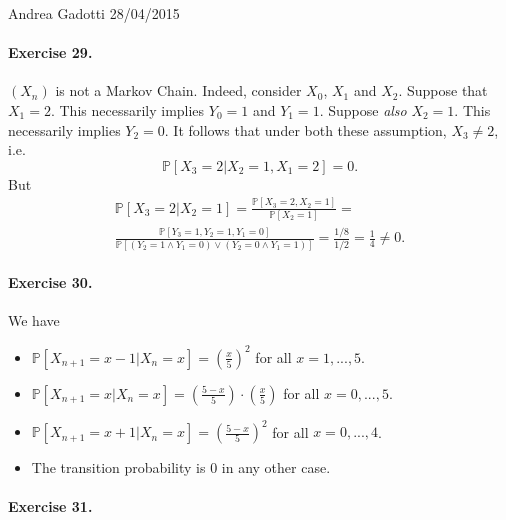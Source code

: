 \documentclass[12pt,a4paper]{report}
\theoremstyle{definition}
\theoremstyle{num.custom-title}
\renewcommand{\1}{\mathbbm{1}}
\renewcommand{\P}{\mathbb{P}}
\begin{document}
\noindent Andrea Gadotti \hfill 28/04/2015

\paragraph{Exercise 29.}

$(X_n)$ is not a Markov Chain. Indeed, consider $X_0$, $X_1$ and $X_2$. Suppose that $X_1=2$. This necessarily implies $Y_0=1$ and $Y_1=1$. Suppose \emph{also} $X_2=1$. This necessarily implies $Y_2=0$. It follows that under both these assumption, $X_3 \neq 2$, i.e.
\[
\P[X_3 = 2 | X_2=1, X_1=2] = 0.
\]
But
\begin{multline*}
\P[X_3 = 2 | X_2=1] = \frac{\P[X_3 = 2, X_2=1]}{\P[X_2=1]} = \\
\frac{\P[Y_3=1,Y_2=1,Y_1=0]}{\P[(Y_2=1 \wedge Y_1=0) \vee (Y_2=0 \wedge Y_1=1)]} = \frac{1/8}{1/2} = \frac{1}{4} \neq 0.
\end{multline*}


\paragraph{Exercise 30.}

We have 
\begin{itemize}
\item $\P[X_{n+1} = x-1 | X_n = x] = \left( \frac{x}{5} \right)^2$ for all $x=1,...,5$.
\item $\P[X_{n+1} = x | X_n = x] = \left( \frac{5-x}{5} \right) \cdot \left( \frac{x}{5} \right)$ for all $x=0,...,5$.
\item $\P[X_{n+1} = x+1 | X_n = x] = \left( \frac{5-x}{5} \right)^2$ for all $x=0,...,4$.
\item The transition probability is $0$ in any other case.
\end{itemize}


\paragraph{Exercise 31.}
\end{document}
